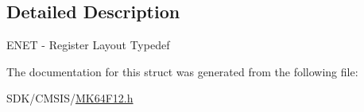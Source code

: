 \begin{DoxyCompactItemize}
\begin{tabbing}
\end{tabbing}\end{DoxyCompactItemize}


\subsection{Detailed Description}
E\+N\+ET -\/ Register Layout Typedef 

The documentation for this struct was generated from the following file\+:\begin{DoxyCompactItemize}
\item 
S\+D\+K/\+C\+M\+S\+I\+S/\mbox{\hyperlink{_m_k64_f12_8h}{M\+K64\+F12.\+h}}\end{DoxyCompactItemize}
